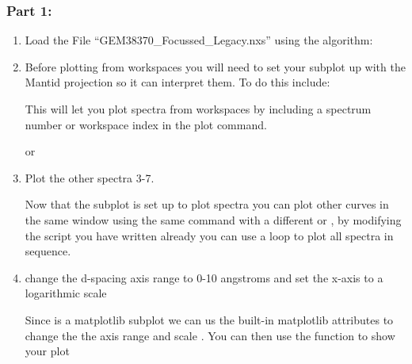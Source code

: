 \documentclass[letterpaper,10pt,english,openany]{sphinxmanual}
\begin{document}
\subsubsection{Part 1:}
\label{\detokenize{mantid_basic_course/using_workbench/05_Exercises:part-1}}\begin{enumerate}
\def\theenumi{\arabic{enumi}}
\def\labelenumi{\theenumi .}
\makeatletter\def\p@enumii{\p@enumi \theenumi .}\makeatother
\item {} 
Load the File “GEM38370\_Focussed\_Legacy.nxs” using the algorithm: 

\item {} 
Before plotting from workspaces you will need to set your subplot up with the Mantid projection so it can interpret them. To do this include:


This will let you plot spectra from workspaces by including a spectrum number  or workspace index  in the plot command.

 or 

\item {} 
Plot the other spectra 3-7.

Now that the subplot is set up to plot spectra you can plot other curves in the same window using the same command with a different 
or , by modifying the script you have written already you can use a  loop to plot all spectra in sequence.

\begin{sphinxVerbatim}[commandchars=\\\{\}]
   
       
\end{sphinxVerbatim}

\item {} 
change the d-spacing axis range to 0-10 angstroms and set the x-axis to a logarithmic scale

Since  is a matplotlib subplot we can us the built-in matplotlib attributes to change the the axis range  and
scale . You can then use the  function to show your plot

\end{enumerate}
\end{document}
